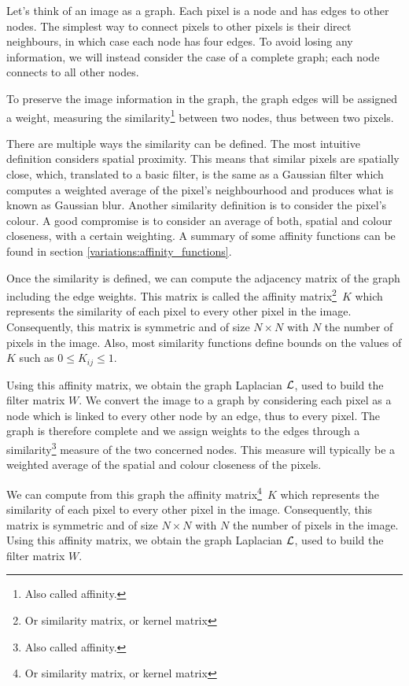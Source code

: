 \ifthesis
 Let's think of an image as a graph.
 Each pixel is a node and has edges to other nodes.
 The simplest way to connect pixels to other pixels is their direct neighbours, in which case each node has four edges.
 To avoid losing any information, we will instead consider the case of a complete graph; each node connects to all other nodes.

 To preserve the image information in the graph, the graph edges will be assigned a weight, measuring the similarity\footnote{Also called affinity.} between two nodes, thus between two pixels.

 There are multiple ways the similarity can be defined.
 The most intuitive definition considers spatial proximity.
 This means that similar pixels are spatially close, which, translated to a basic filter, is the same as a Gaussian filter which computes a weighted average of the pixel's neighbourhood and produces what is known as Gaussian blur.
 Another similarity definition is to consider the pixel's colour.
 A good compromise is to consider an average of both, spatial and colour closeness, with a certain weighting.
 A summary of some affinity functions can be found in section \ref{variations:affinity_functions}.

 Once the similarity is defined, we can compute the adjacency matrix of the graph including the edge weights.
 This matrix is called the affinity matrix\footnote{Or similarity matrix, or kernel matrix}\ \(K\) which represents the similarity of each pixel to every other pixel in the image.
 Consequently, this matrix is symmetric and of size \(N \times N\) with \(N\) the number of pixels in the image.
 Also, most similarity functions define bounds on the values of \(K\) such as \(0 \le K_{ij} \le 1\).

 Using this affinity matrix, we obtain the graph Laplacian \(\operatorname{\mathcal{L}}\), used to build the filter matrix \(W\).
\else
 We convert the image to a graph by considering each pixel as a node which is linked to every other node by an edge, thus to every pixel.
 The graph is therefore complete and we assign weights to the edges through a similarity\footnote{Also called affinity.} measure of the two concerned nodes.
 This measure will typically be a weighted average of the spatial and colour closeness of the pixels.

 We can compute from this graph the affinity matrix\footnote{Or similarity matrix, or kernel matrix}\ \(K\) which represents the similarity of each pixel to every other pixel in the image.
 Consequently, this matrix is symmetric and of size \(N \times N\) with \(N\) the number of pixels in the image.
 Using this affinity matrix, we obtain the graph Laplacian \(\operatorname{\mathcal{L}}\), used to build the filter matrix \(W\).
\fi
